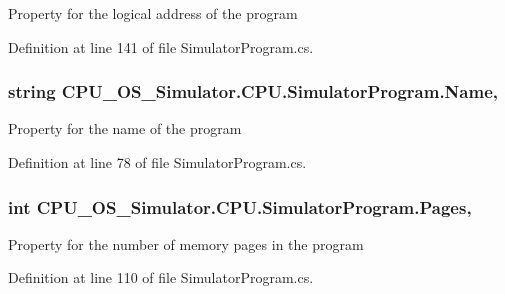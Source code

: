 Property for the logical address of the program 



Definition at line 141 of file Simulator\+Program.\+cs.

\hypertarget{class_c_p_u___o_s___simulator_1_1_c_p_u_1_1_simulator_program_a29b077a3403773010be9efe912d11b92}{}
\subsubsection[{Name}]{\setlength{\rightskip}{0pt plus 5cm}string C\+P\+U\+\_\+\+O\+S\+\_\+\+Simulator.\+C\+P\+U.\+Simulator\+Program.\+Name\hspace{0.3cm}{\ttfamily [get]}, {\ttfamily [set]}}\label{class_c_p_u___o_s___simulator_1_1_c_p_u_1_1_simulator_program_a29b077a3403773010be9efe912d11b92}


Property for the name of the program 



Definition at line 78 of file Simulator\+Program.\+cs.

\hypertarget{class_c_p_u___o_s___simulator_1_1_c_p_u_1_1_simulator_program_aa33b4428956a097dd710948ee51bb5f3}{}
\subsubsection[{Pages}]{\setlength{\rightskip}{0pt plus 5cm}int C\+P\+U\+\_\+\+O\+S\+\_\+\+Simulator.\+C\+P\+U.\+Simulator\+Program.\+Pages\hspace{0.3cm}{\ttfamily [get]}, {\ttfamily [set]}}\label{class_c_p_u___o_s___simulator_1_1_c_p_u_1_1_simulator_program_aa33b4428956a097dd710948ee51bb5f3}


Property for the number of memory pages in the program 



Definition at line 110 of file Simulator\+Program.\+cs.

